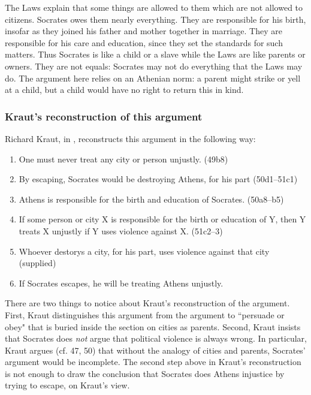 \documentclass[12pt,letterpaper]{article}
\begin{document}
The Laws explain that some things are allowed to them which are not allowed
to citizens. Socrates owes them nearly everything. They are responsible
for his birth, insofar as they joined his father and mother together in
marriage. They are responsible for his care and education, since they set
the standards for such matters. Thus Socrates is like a child or a slave
while the Laws are like parents or owners. They are not equals: Socrates
may not do everything that the Laws may do. The argument here relies on an
Athenian norm: a parent might strike or yell at a child, but a child would
have no right to return this in kind.

\subsubsection*{Kraut's reconstruction of this argument}

Richard Kraut, in \cite{kraut1984}, reconstructs this argument in the following way:

\begin{enumerate}

    \item One must never treat any city or person unjustly. (49b8)

    \item By escaping, Socrates would be destroying Athens, for his part (50d1--51c1)

    \item Athens is responsible for the birth and education of Socrates. (50a8--b5)

    \item If some person or city X is responsible for the birth or education of Y, then Y treats X unjustly if Y uses violence against X. (51c2--3)

    \item Whoever destorys a city, for his part, uses violence against that city (supplied)

    \item If Socrates escapes, he will be treating Athens unjustly.

\end{enumerate}

There are two things to notice about Kraut's reconstruction of the argument. First, Kraut distinguishes this argument from the argument to ``persuade or obey" that is buried inside the section on cities as parents. Second, Kraut insists that Socrates does \emph{not} argue that political violence is always wrong. In particular, Kraut argues (cf. 47, 50) that without the analogy of cities and parents, Socrates' argument would be incomplete. The second step above in Kraut's reconstruction is not enough to draw the conclusion that Socrates does Athens injustice by trying to escape, on Kraut's view.
\end{document}
